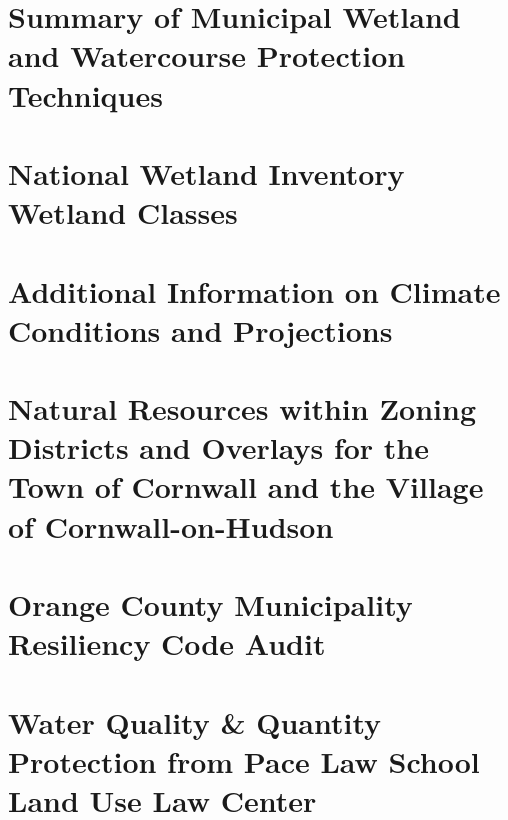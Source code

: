 \documentclass[11pt,fleqn, openany]{book} %
\begin{document}
\chapter{Summary of Municipal Wetland and Watercourse Protection Techniques}
\label{app:wetland_protection}

\chapter{National Wetland Inventory Wetland Classes}
\label{app:cornwall_wetlands}

\chapter{Additional Information on Climate Conditions and Projections}
\label{app:climate_projection}

\chapter{Natural Resources within Zoning Districts and Overlays for the Town 
of Cornwall and the Village of Cornwall-on-Hudson}
\label{app:zoning}

\chapter{Orange County Municipality Resiliency Code Audit}
\label{app:oc_resiliency}

\chapter{Water Quality \& Quantity Protection from Pace Law School Land Use Law 
Center}
\label{app:water_quality}


\end{document}
